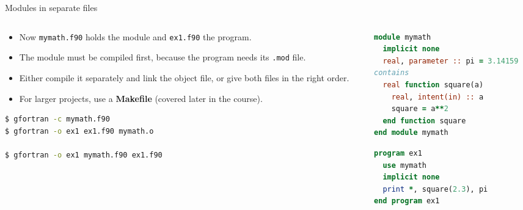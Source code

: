 \begin{frame}[fragile]{Modules in separate files}
  \begin{columns}[T]
    \begin{column}{0.52\textwidth}
      \begin{itemize}
        \item Now \texttt{mymath.f90} holds the module and \texttt{ex1.f90} the program.
        \item The module must be compiled first, because the program needs its \texttt{.mod} file.
        \item Either compile it separately and link the object file, or give both files in the right order.
        \item For larger projects, use a \textbf{Makefile} (covered later in the course).
      \end{itemize}
      \begin{lstlisting}[language=bash]
$ gfortran -c mymath.f90
$ gfortran -o ex1 ex1.f90 mymath.o

$ gfortran -o ex1 mymath.f90 ex1.f90
      \end{lstlisting}
    \end{column}

    \begin{column}{0.48\textwidth}
\begin{lstlisting}[language=Fortran,caption={mymath.f90}]
module mymath
  implicit none
  real, parameter :: pi = 3.14159
contains
  real function square(a)
    real, intent(in) :: a
    square = a**2
  end function square
end module mymath
\end{lstlisting}

\begin{lstlisting}[language=Fortran,caption={ex1.f90}]
program ex1
  use mymath
  implicit none
  print *, square(2.3), pi
end program ex1
\end{lstlisting}
    \end{column}
  \end{columns}
\end{frame}


